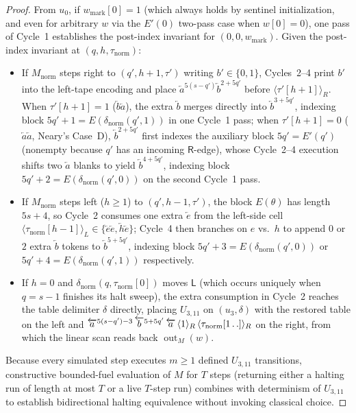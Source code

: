 \documentclass[11pt,reqno]{amsart}
\numberwithin{equation}{section}
\theoremstyle{plain}
\theoremstyle{definition}
\theoremstyle{remark}
\DeclareMathOperator{\out}{out}
\begin{document}
\begin{proof}
From $u_0$, if $w_{\mathrm{mark}}[0] = 1$ (which always holds by sentinel initialization, and even for arbitrary $w$ via the $E'(0)$ two-pass case when $w[0]=0$), one pass of Cycle~1 establishes the post-index invariant for $(0, 0, w_{\mathrm{mark}})$. Given the post-index invariant at $(q, h, \tau_{\mathrm{norm}})$:
\begin{itemize}[leftmargin=2.0em]
  \item If $M_{\mathrm{norm}}$ steps right to $(q', h+1, \tau')$ writing $b' \in \{0,1\}$, Cycles~2--4 print $b'$ into the left-tape encoding and place $\overleftarrow{a}^{5(s-q')}\overleftarrow{b}^{2+5q'}$ before $\langle \tau'[h+1] \rangle_R$. When $\tau'[h+1] = 1$ ($\overleftarrow{b}\overleftarrow{a}$), the extra $\overleftarrow{b}$ merges directly into $\overleftarrow{b}^{3+5q'}$, indexing block $5q'+1 = E(\delta_{\mathrm{norm}}(q',1))$ in one Cycle~1 pass; when $\tau'[h+1] = 0$ ($\overleftarrow{a}\overleftarrow{a}$, Neary's Case~D), $\overleftarrow{b}^{2+5q'}$ first indexes the auxiliary block $5q' = E'(q')$ (nonempty because $q'$ has an incoming $\mathsf{R}$-edge), whose Cycle~2--4 execution shifts two $\overleftarrow{a}$ blanks to yield $\overleftarrow{b}^{4+5q'}$, indexing block $5q'+2 = E(\delta_{\mathrm{norm}}(q',0))$ on the second Cycle~1 pass.
  \item If $M_{\mathrm{norm}}$ steps left ($h \ge 1$) to $(q', h-1, \tau')$, the block $E(\theta)$ has length $5s + 4$, so Cycle~2 consumes one extra $\overleftarrow{e}$ from the left-side cell $\langle \tau_{\mathrm{norm}}[h-1] \rangle_L \in \{\overleftarrow{e}\overleftarrow{e}, \overleftarrow{h}\overleftarrow{e}\}$; Cycle~4 then branches on $e$ vs.\ $h$ to append $0$ or $2$ extra $\overleftarrow{b}$ tokens to $\overleftarrow{b}^{5+5q'}$, indexing block $5q'+3 = E(\delta_{\mathrm{norm}}(q',0))$ or $5q'+4 = E(\delta_{\mathrm{norm}}(q',1))$ respectively.
  \item If $h = 0$ and $\delta_{\mathrm{norm}}(q, \tau_{\mathrm{norm}}[0])$ moves $\mathsf{L}$ (which occurs uniquely when $q = s - 1$ finishes its halt sweep), the extra consumption in Cycle~2 reaches the table delimiter $\delta$ directly, placing $U_{3,11}$ on $(u_3, \delta)$ with the restored table on the left and $\overleftarrow{a}^{5(s-q')-3}\,\overleftarrow{b}^{5+5q'}\,\overleftarrow{a}\,\langle 1 \rangle_R\,\langle \tau_{\mathrm{norm}}[1\mathinner{\ldotp\ldotp}] \rangle_R$ on the right, from which the linear scan reads back $\out_M(w)$.
\end{itemize}
Because every simulated step executes $m \ge 1$ defined $U_{3,11}$ transitions, constructive bounded-fuel evaluation of $M$ for $T$ steps (returning either a halting run of length at most $T$ or a live $T$-step run) combines with determinism of $U_{3,11}$ to establish bidirectional halting equivalence without invoking classical choice.
\end{proof}
\end{document}
